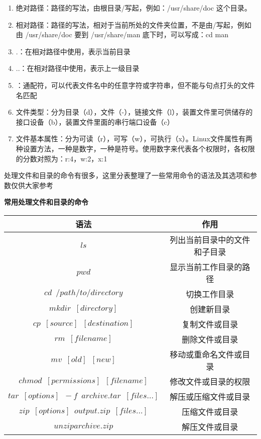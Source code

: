 \begin{enumerate}
\item 绝对路径：路径的写法，由根目录\enspace /\enspace 写起，例如：/usr/share/doc 这个目录。
\item 相对路径：路径的写法，相对于当前所处的文件夹位置，不是由\enspace /\enspace 写起，例如由 /usr/share/doc 要到 /usr/share/man 底下时，可以写成：cd man
\item \enspace .\enspace ：在相对路径中使用，表示当前目录
\item \enspace ..\enspace ：在相对路径中使用，表示上一级目录
\item \enspace *\enspace ：通配符，可以代表文件名中的任意字符或字符串，但不能与句点打头的文件名匹配
\item 文件类型：分为目录（d），文件（-），链接文件（l），装置文件里可供储存的接口设备（b），装置文件里面的串行端口设备（c）
\item 文件基本属性：分为可读（r），可写（w），可执行（x）。Linux文件属性有两种设置方法，一种是数字，一种是符号。使用数字来代表各个权限时，各权限的分数对照为：r:4，w:2，x:1
\end{enumerate}

处理文件和目录的命令有很多，这里分表整理了一些常用命令的语法及其选项和参数仅供大家参考

\begin{center}
\textbf{常用处理文件和目录的命令}

	\begin{tabular}{cc}
		\toprule[1.5pt]
		语法 & 作用\\
		\midrule[1pt]
		$  ls$		&列出当前目录中的文件和子目录\\
		$  pwd$		&显示当前工作目录的路径\\
		$  cd\enspace /path/to/directory$		&切换工作目录\\
		$  mkdir\enspace [directory]$		&创建新目录\\
		$  cp\enspace [source]\enspace [destination]$		&复制文件或目录\\
		$  rm\enspace [file name]$		&删除文件或目录\\
		$  mv\enspace [old]\enspace [new]$		&移动或重命名文件或目录\\
		$  chmod\enspace [permissions]\enspace [file name]$		&修改文件或目录的权限\\
		$  tar\enspace [options]\enspace -f\enspace archive.tar\enspace [files...]$	&解压或压缩文件或目录\\
		$  zip\enspace [options]\enspace output.zip\enspace [files...]$		&压缩文件或目录\\
		$ unzip archive.zip$		&解压文件或目录\\
		\bottomrule[1.5pt]
	\end{tabular}
\end{center}

